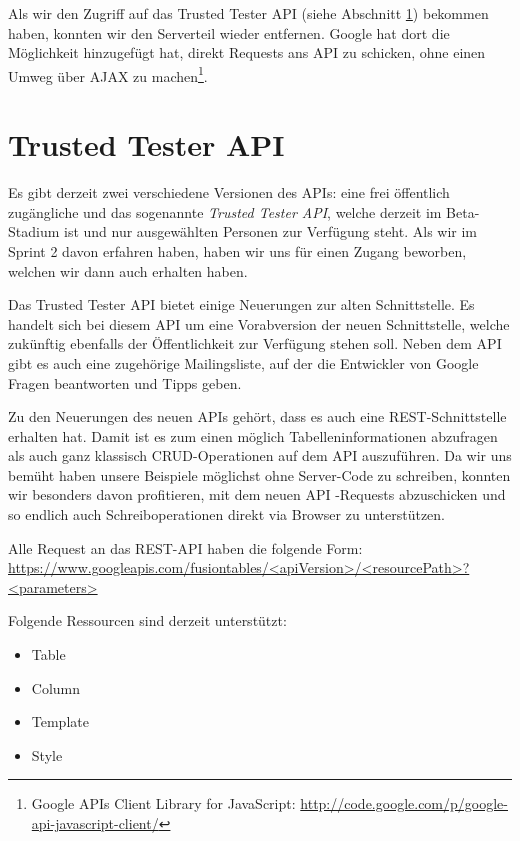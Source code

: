 Als wir den Zugriff auf das Trusted Tester API (siehe Abschnitt \ref{trusted-tester-api}) bekommen haben, konnten wir den Serverteil wieder entfernen. Google hat dort die Möglichkeit hinzugefügt hat, direkt Requests ans API zu schicken, ohne einen Umweg über \gls{AJAX}  zu machen\footnote{Google APIs Client Library for JavaScript: \url{http://code.google.com/p/google-api-javascript-client/}}.

\section{Trusted Tester API}
\label{trusted-tester-api}
Es gibt derzeit zwei verschiedene Versionen des APIs: eine frei öffentlich zugängliche und das sogenannte \emph{Trusted Tester API}, welche derzeit im Beta-Stadium ist und nur ausgewählten Personen zur Verfügung steht. Als wir im Sprint 2 davon erfahren haben, haben wir uns für einen Zugang beworben, welchen wir dann auch erhalten haben.

Das Trusted Tester API bietet einige Neuerungen zur alten Schnittstelle. Es handelt sich bei diesem API um eine Vorabversion der neuen Schnittstelle, welche zukünftig ebenfalls der Öffentlichkeit zur Verfügung stehen soll. Neben dem API gibt es auch eine zugehörige Mailingsliste, auf der die Entwickler von Google Fragen beantworten und Tipps geben.

Zu den Neuerungen des neuen APIs gehört, dass es auch eine \gls{REST}-Schnittstelle erhalten hat. Damit ist es zum einen möglich Tabelleninformationen abzufragen als auch ganz klassisch CRUD-Operationen auf dem API auszuführen. Da wir uns bemüht haben unsere Beispiele möglichst ohne Server-Code zu schreiben, konnten wir besonders davon profitieren, mit dem neuen API -Requests abzuschicken und so endlich auch Schreiboperationen direkt via Browser zu unterstützen.

Alle Request an das \gls{REST}-API haben die folgende Form: \\
\url{https://www.googleapis.com/fusiontables/<apiVersion>/<resourcePath>?<parameters>}

Folgende Ressourcen sind derzeit unterstützt:
\begin{itemize}
	\item Table
	\item Column
	\item Template
	\item Style
\end{itemize}

